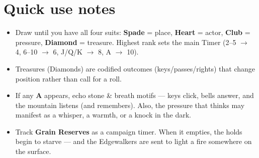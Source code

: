 \section*{Quick use notes}
\label{sec:aeler-quick-use}
\begin{itemize}
\item Draw until you have all four suits: \textbf{Spade} = place, \textbf{Heart} = actor, \textbf{Club} = pressure, \textbf{Diamond} = treasure. Highest rank sets the main Timer (2--5 $\rightarrow$ 4, 6--10 $\rightarrow$ 6, J/Q/K $\rightarrow$ 8, A $\rightarrow$ 10).
\item Treasures (Diamonds) are codified outcomes (keys/passes/rights) that change position rather than call for a roll.
\item If any \textbf{A} appears, echo stone \& breath motifs --- keys click, bells answer, and the mountain listens (and remembers). Also, the pressure that thinks may manifest as a whisper, a warmth, or a knock in the dark.
\item Track \textbf{Grain Reserves} as a campaign timer. When it empties, the holds begin to starve --- and the Edgewalkers are sent to light a fire somewhere on the surface.
\end{itemize}

